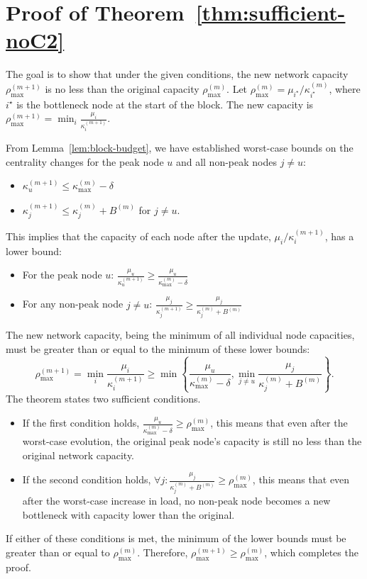 \documentclass[journal]{IEEEtran}
\begin{document}
\section{Proof of Theorem~\ref{thm:sufficient-noC2}}
\label{app:proof_thm_sufficient_noC2}
\begin{IEEEproof}
The goal is to show that under the given conditions, the new network capacity $\rho_{\max}^{(m+1)}$ is no less than the original capacity $\rho_{\max}^{(m)}$.
Let $\rho_{\max}^{(m)} = \mu_{i^\star}/\kappa^{(m)}_{i^\star}$, where $i^\star$ is the bottleneck node at the start of the block.
The new capacity is $\rho_{\max}^{(m+1)} = \min_i \frac{\mu_i}{\kappa^{(m+1)}_i}$.

From Lemma~\ref{lem:block-budget}, we have established worst-case bounds on the centrality changes for the peak node $u$ and all non-peak nodes $j \neq u$:
\begin{itemize}
    \item $\kappa^{(m+1)}_u \le \kappa^{(m)}_{\max} - \delta$
    \item $\kappa^{(m+1)}_j \le \kappa^{(m)}_j + B^{(m)}$ for $j \neq u$.
\end{itemize}
This implies that the capacity of each node after the update, $\mu_i / \kappa^{(m+1)}_i$, has a lower bound:
\begin{itemize}
    \item For the peak node $u$: $\frac{\mu_u}{\kappa^{(m+1)}_u} \ge \frac{\mu_u}{\kappa^{(m)}_{\max} - \delta}$
    \item For any non-peak node $j \neq u$: $\frac{\mu_j}{\kappa^{(m+1)}_j} \ge \frac{\mu_j}{\kappa^{(m)}_j + B^{(m)}}$
\end{itemize}
The new network capacity, being the minimum of all individual node capacities, must be greater than or equal to the minimum of these lower bounds:
\begin{equation}
\rho_{\max}^{(m+1)} = \min_i \frac{\mu_i}{\kappa^{(m+1)}_i} \ge \min \! \left\{ \frac{\mu_u}{\kappa^{(m)}_{\max} - \delta}, \min_{j \neq u} \frac{\mu_j}{\kappa^{(m)}_j + B^{(m)}} \right\}.
\end{equation}
The theorem states two sufficient conditions.
\begin{itemize}
    \item If the first condition holds, $\frac{\mu_u}{\kappa^{(m)}_{\max}-\delta} \ge \rho_{\max}^{(m)}$, this means that even after the worst-case evolution, the original peak node's capacity is still no less than the original network capacity.
    \item If the second condition holds, $\forall j: \frac{\mu_j}{\kappa^{(m)}_{j}+B^{(m)}} \ge \rho_{\max}^{(m)}$, this means that even after the worst-case increase in load, no non-peak node becomes a new bottleneck with capacity lower than the original.
\end{itemize}
If either of these conditions is met, the minimum of the lower bounds must be greater than or equal to $\rho_{\max}^{(m)}$. Therefore, $\rho_{\max}^{(m+1)} \ge \rho_{\max}^{(m)}$, which completes the proof.
\end{IEEEproof}
\end{document}
